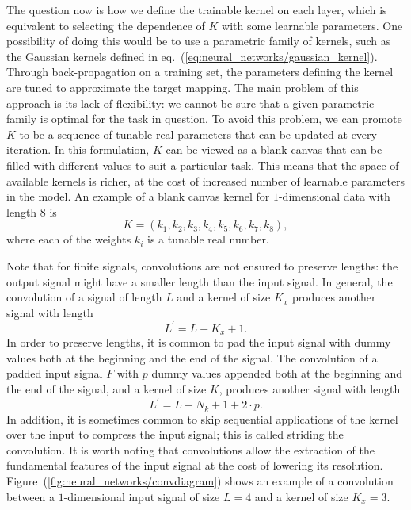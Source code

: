The question now is how we define the trainable kernel on each layer, which is equivalent to
selecting the dependence of $K$ with some learnable parameters. One possibility of doing this would
be to use a parametric family of kernels, such as the Gaussian kernels defined in
eq.~(\ref{eq:neural_networks/gaussian_kernel}). Through back-propagation on a training set, the
parameters defining the kernel are tuned to approximate the target mapping. The main problem of this
approach is its lack of flexibility: we cannot be sure that a given parametric family is optimal for
the task in question. To avoid this problem, we can promote $K$ to be a sequence of tunable real
parameters that can be updated at every iteration. In this formulation, $K$ can be viewed as a blank
canvas that can be filled with different values to suit a particular task. This means that the space
of available kernels is richer, at the cost of increased number of learnable parameters in the
model. An example of a blank canvas kernel for $1$-dimensional data with length $8$ is
\begin{equation}
    K = (k_1, k_2, k_3, k_4, k_5, k_6, k_7, k_8), 
\end{equation}
where each of the weights $k_i$ is a tunable real number.
 
Note that for finite signals, convolutions are not ensured to preserve lengths: the output signal
might have a smaller length than the input signal. In general, the convolution of a signal of length
$L$ and a kernel of size $K_x$ produces another signal with length 
\begin{equation}
    L^\prime = L - K_x + 1.
\end{equation}
In order to preserve lengths, it is common to pad the input signal with dummy values both at the
beginning and the end of the signal. The convolution of a padded input signal $F$ with $p$ dummy
values appended both at the beginning and the end of the signal, and a kernel of size $K$, produces
another signal with length
\begin{equation}
    L^\prime = L - N_k + 1 + 2 \cdot p.
    \label{eq:neural_networks/length_shrink}
\end{equation}
In addition, it is sometimes common to skip sequential applications of the kernel over the input to
compress the input signal; this is called striding the convolution. It is worth noting that
convolutions allow the extraction of the fundamental features of the input signal at the cost of
lowering its resolution. Figure~(\ref{fig:neural_networks/convdiagram}) shows an example of a
convolution between a $1$-dimensional input signal of size $L = 4$ and a kernel of size $K_x = 3$.

